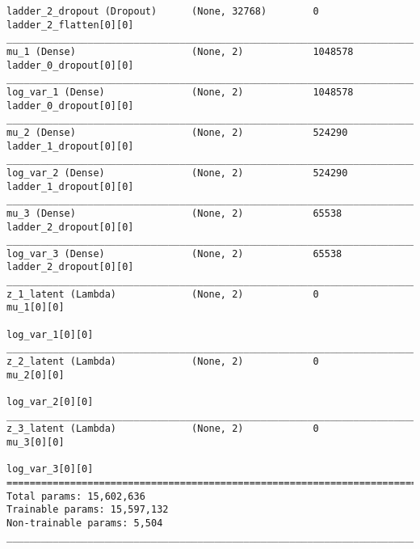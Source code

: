 \begin{lstlisting}[caption={CelebA-VLAE Encoder},captionpos=b,basicstyle=\tiny, label={lst:celeba-vlae-encoder}]
ladder_2_dropout (Dropout)      (None, 32768)        0           ladder_2_flatten[0][0]
__________________________________________________________________________________________________
mu_1 (Dense)                    (None, 2)            1048578     ladder_0_dropout[0][0]
__________________________________________________________________________________________________
log_var_1 (Dense)               (None, 2)            1048578     ladder_0_dropout[0][0]
__________________________________________________________________________________________________
mu_2 (Dense)                    (None, 2)            524290      ladder_1_dropout[0][0]
__________________________________________________________________________________________________
log_var_2 (Dense)               (None, 2)            524290      ladder_1_dropout[0][0]
__________________________________________________________________________________________________
mu_3 (Dense)                    (None, 2)            65538       ladder_2_dropout[0][0]
__________________________________________________________________________________________________
log_var_3 (Dense)               (None, 2)            65538       ladder_2_dropout[0][0]
__________________________________________________________________________________________________
z_1_latent (Lambda)             (None, 2)            0           mu_1[0][0]
                                                                 log_var_1[0][0]
__________________________________________________________________________________________________
z_2_latent (Lambda)             (None, 2)            0           mu_2[0][0]
                                                                 log_var_2[0][0]
__________________________________________________________________________________________________
z_3_latent (Lambda)             (None, 2)            0           mu_3[0][0]
                                                                 log_var_3[0][0]
==================================================================================================
Total params: 15,602,636
Trainable params: 15,597,132
Non-trainable params: 5,504
__________________________________________________________________________________________________
\end{lstlisting}